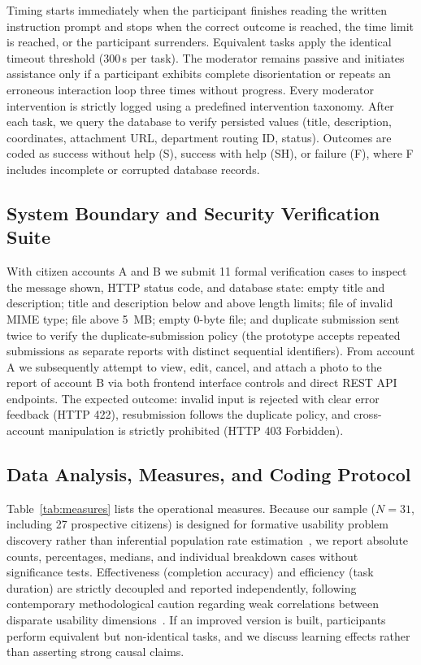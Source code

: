 \documentclass[11pt, runningheads, a4paper]{llncs}
\newcommand{\rev}[1]{#1}
\begin{document}
Timing starts immediately when the participant finishes reading the written instruction prompt
and stops when the correct outcome is reached, the time limit is reached, or the participant
surrenders. Equivalent tasks apply the identical timeout threshold (300\,s per task).
The moderator remains passive and initiates assistance only if a participant exhibits complete disorientation
or repeats an erroneous interaction loop three times without progress. Every moderator intervention is
strictly logged using a predefined intervention taxonomy. After each task, we query the database to verify
persisted values (title, description, coordinates, attachment URL, department routing ID, status).
Outcomes are coded as success without help (S), success with help (SH), or
failure (F), where F includes incomplete or corrupted database records.

\subsection{System Boundary and Security Verification Suite}
\label{sec:validation}
With citizen accounts A and B we submit 11 formal verification cases to inspect the
message shown, HTTP status code, and database state: empty title and description;
title and description below and above length limits; file of invalid MIME type;
file above 5~MB; empty 0-byte file; and duplicate submission sent twice to verify
the duplicate-submission policy (the prototype accepts repeated submissions as separate reports with distinct sequential identifiers).
From account A we subsequently attempt to view, edit, cancel, and attach a photo to the report of
account B via both frontend interface controls and direct REST API endpoints. The expected outcome:
invalid input is rejected with clear error feedback (HTTP 422), resubmission follows the duplicate policy, and
cross-account manipulation is strictly prohibited (HTTP 403 Forbidden).

\subsection{Data Analysis, Measures, and Coding Protocol}
Table~\ref{tab:measures} lists the operational measures. \rev{Because our sample (\mbox{$N=31$}, including 27 prospective citizens) is designed for formative usability problem discovery rather than inferential population rate estimation~\cite{lewis2021},}
we report absolute counts, percentages, medians, and individual breakdown cases without significance tests.
Effectiveness (completion accuracy) and efficiency (task duration) are strictly decoupled and reported
independently, following contemporary methodological caution regarding weak correlations between disparate
usability dimensions~\cite{lewis2024}. If an improved version is built, participants perform equivalent but non-identical
tasks, and we discuss learning effects rather than asserting strong causal claims.
\end{document}
